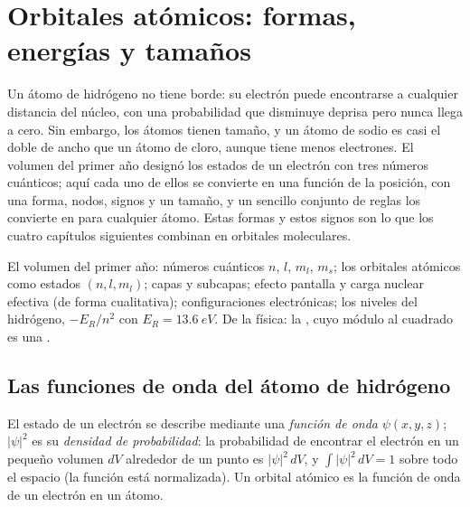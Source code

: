 \chapter{Orbitales atómicos: formas, energías y tamaños}\label{ch:b2:atomic-orbitals}

Un átomo de hidrógeno no tiene borde: su electrón puede encontrarse a cualquier distancia del
núcleo, con una probabilidad que disminuye deprisa pero nunca llega a
cero. Sin embargo, los átomos tienen tamaño, y un átomo de sodio es casi el doble de ancho que un
átomo de cloro, aunque tiene menos electrones. El volumen del primer año designó los
estados de un electrón con tres números cuánticos; aquí cada uno de ellos se convierte en una
función de la posición, con una forma, nodos, signos y un tamaño, y un sencillo conjunto
de reglas los convierte en  para cualquier átomo. Estas formas y estos signos
son lo que los cuatro capítulos siguientes combinan en orbitales moleculares.

\begin{recall}
El volumen del primer año: números cuánticos $n$, $l$, $m_l$, $m_s$; los orbitales atómicos como
estados $(n, l, m_l)$; capas y subcapas; efecto pantalla y carga nuclear
efectiva (de forma cualitativa); configuraciones electrónicas; los niveles del hidrógeno,
$-E_R/n^2$ con $E_R = \qty{13.6}{eV}$. De la física: la , cuyo
módulo al cuadrado es una .
\end{recall}

\section{Las funciones de onda del átomo de hidrógeno}

\begin{definition}\label{def:b2:atomic-orbitals:wavefunction}
El estado de un electrón se describe mediante una \emph{función de onda}
$\psi(x, y, z)$; $|\psi|^2$ es su \emph{densidad de probabilidad}:
la probabilidad de encontrar el electrón en un pequeño volumen $dV$ alrededor de
un punto es $|\psi|^2\,dV$, y $\int|\psi|^2\,dV = 1$ sobre todo el espacio (la función
está normalizada). Un orbital atómico es la función de onda de un electrón en un
átomo.
\end{definition}

